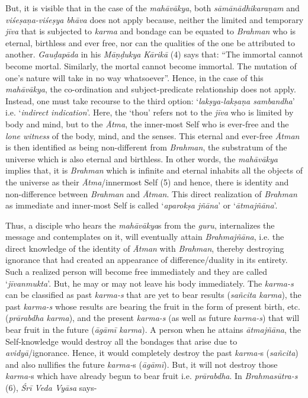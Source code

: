 But, it is visible that in the case of the \emph{mahāvākya}, both \emph{sāmānādhi\-karaṇam} and \emph{viśeṣaṇa-viśeṣya bhāva} does not apply because, neither the limited and temporary \emph{jīva} that is subjected to \emph{karma} and bondage can be equated to \emph{Brahman} who is eternal, birthless and ever free, nor can the qualities of the one be attributed to another. \emph{Gauḍapāda} in his \emph{Māṇḍukya} \emph{Kārikā} (4) says that: ``The immortal cannot become mortal. Similarly, the mortal cannot become immortal. The mutation of one's nature will take in no way whatsoever''. Hence, in the case of this \emph{mahāvākya}, the co-ordination and subject-predicate relationship does not apply. Instead, one must take recourse to the third option: `\emph{lakṣya-lakṣaṇa sambandha}' i.e. `\emph{indirect indication}'. Here, the `thou' refers not to the \emph{jīva} who is limited by body and mind, but to the \emph{Ātma}, the inner-most Self who is ever-free and the \emph{lone witness} of the body, mind, and the senses. This eternal and ever-free \emph{Ātman} is then identified as being non-different from \emph{Brahman}, the substratum of the universe which is also eternal and birthless. In other words, the \emph{mahāvākya} implies that, it is \emph{Brahman} which is infinite and eternal inhabits all the objects of the universe as their \emph{Ātma}/innermost Self (5) and hence, there is identity and non-difference between \emph{Brahman} and \emph{Ātman}. This direct realization of \emph{Brahman} as immediate and inner-most Self is called `\emph{aparokṣa jñāna}' or `\emph{ātmajñāna}'.

Thus, a disciple who hears the \emph{mahāvākya}s from the \emph{guru}, internalizes the message and contemplates on it, will eventually attain \emph{Brahmajñāna}, i.e. the direct knowledge of the identity of \emph{Ātman} with \emph{Brahman}, thereby destroying ignorance that had created an appearance of difference/duality in its entirety. Such a realized person will become free immediately and they are called `\emph{jīvanmukta}'. But, he may or may not leave his body immediately. The \emph{karma-s} can be classified as past \emph{karma-s} that are yet to bear results (\emph{sañcita karma}), the past \emph{karma-s} whose results are bearing the fruit in the form of present birth, etc. (\emph{prārabdha karma}), and the present \emph{karma-s} (as well as future \emph{karma-s}) that will bear fruit in the future (\emph{āgāmī karma}). A person when he attains \emph{ātmajñāna}, the Self-knowledge would destroy all the bondages that arise due to \emph{avidyā}/ignorance. Hence, it would completely destroy the past \emph{karma-}s (\emph{sañcita}) and also nullifies the future \emph{karma-}s (\emph{āgāmī}). But, it will not destroy those \emph{karma-}s which have already begun to bear fruit i.e. \emph{prārabdha}. In \emph{Brahmasūtra-s} (6), \emph{Śrī Veda Vyāsa} says-

